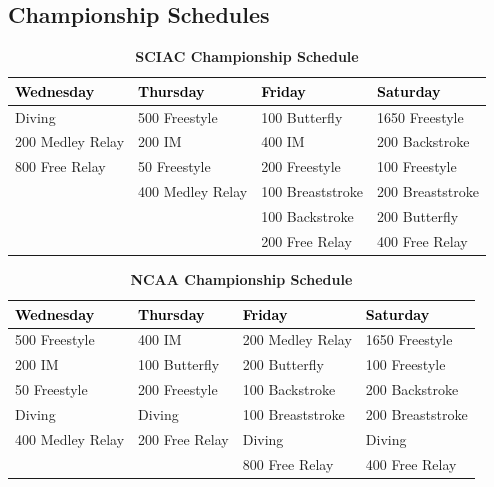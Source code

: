 
\subsection*{Championship Schedules}

\begin{table}[H]
\centering
\caption*{\textbf{\textcolor{teamprimary}{SCIAC Championship Schedule}}}
\renewcommand{\arraystretch}{1.3}
\begin{tabular}{p{3.5cm} p{3.5cm} p{3.5cm} p{3.5cm}}
\toprule
\rowcolor{teamprimary!25}
\textbf{\textcolor{black}{Wednesday}} & \textbf{\textcolor{black}{Thursday}} & \textbf{\textcolor{black}{Friday}} & \textbf{\textcolor{black}{Saturday}} \\
\midrule
\rowcolor{teamsecondary!12}
Diving & 500 Freestyle & 100 Butterfly & 1650 Freestyle \\
\rowcolor{teamprimary!8}
200 Medley Relay & 200 IM & 400 IM & 200 Backstroke \\
\rowcolor{teamsecondary!12}
800 Free Relay & 50 Freestyle & 200 Freestyle & 100 Freestyle \\
\rowcolor{teamprimary!8}
 & 400 Medley Relay & 100 Breaststroke & 200 Breaststroke \\
\rowcolor{teamsecondary!12}
 &  & 100 Backstroke & 200 Butterfly \\
\rowcolor{teamprimary!8}
 &  & 200 Free Relay & 400 Free Relay \\
\bottomrule
\end{tabular}
\end{table}

\begin{table}[H]
\centering
\caption*{\textbf{\textcolor{teamprimary}{NCAA Championship Schedule}}}
\renewcommand{\arraystretch}{1.3}
\begin{tabular}{p{3.5cm} p{3.5cm} p{3.5cm} p{3.5cm}}
\toprule
\rowcolor{teamprimary!25}
\textbf{\textcolor{black}{Wednesday}} & \textbf{\textcolor{black}{Thursday}} & \textbf{\textcolor{black}{Friday}} & \textbf{\textcolor{black}{Saturday}} \\
\midrule
\rowcolor{teamsecondary!12}
500 Freestyle & 400 IM & 200 Medley Relay & 1650 Freestyle \\
\rowcolor{teamprimary!8}
200 IM & 100 Butterfly & 200 Butterfly & 100 Freestyle \\
\rowcolor{teamsecondary!12}
50 Freestyle & 200 Freestyle & 100 Backstroke & 200 Backstroke \\
\rowcolor{teamprimary!8}
Diving & Diving & 100 Breaststroke & 200 Breaststroke \\
\rowcolor{teamsecondary!12}
400 Medley Relay & 200 Free Relay & Diving & Diving \\
\rowcolor{teamprimary!8}
 &  & 800 Free Relay & 400 Free Relay \\
\bottomrule
\end{tabular}
\end{table}



